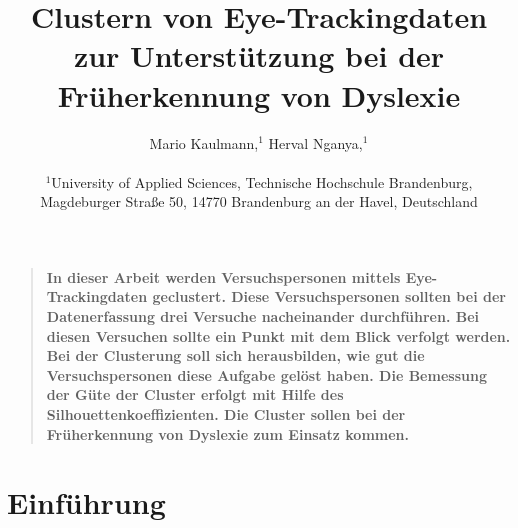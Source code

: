 \documentclass[12pt]{article}
\title{Clustern von Eye-Trackingdaten zur Unterst\"utzung bei der Fr\"uherkennung von Dyslexie}
\author
{Mario Kaulmann,$^{1}$ Herval Nganya,$^{1}$\\
\\
\normalsize{$^{1}$University of Applied Sciences, Technische Hochschule Brandenburg,}\\
\normalsize{Magdeburger Stra\ss{}e 50, 14770 Brandenburg an der Havel, Deutschland}\\
}
\date{}
\newenvironment{sciabstract}{%
\begin{quote} \bf}
{\end{quote}}
\begin{document}
 


\baselineskip18pt


\maketitle 




\begin{sciabstract}
  In dieser Arbeit werden Versuchspersonen mittels Eye-Trackingdaten geclustert. Diese Versuchspersonen sollten bei der Datenerfassung drei Versuche nacheinander durchf\"uhren. Bei diesen Versuchen sollte ein Punkt mit dem Blick verfolgt werden. Bei der Clusterung soll sich herausbilden, wie gut die Versuchspersonen diese Aufgabe gel\"ost haben. Die Bemessung der G\"ute der Cluster erfolgt mit Hilfe des Silhouettenkoeffizienten. Die Cluster sollen bei der Fr\"uherkennung von Dyslexie zum Einsatz kommen.
\end{sciabstract}




\section*{Einf\"uhrung}
\end{document}
